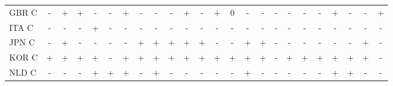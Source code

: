 \documentclass[12pt,bibliography=totoc]{article}
\begin{document}
\begin{appendices}
\begin{table}[H]
\begin{tabular}{l  cccccccc@{\hskip 0.2in}  cccccccc@{\hskip 0.2in}   ccccccc}
GBR C	&\cellcolor{red!25}-	&\cellcolor{green!25}+	&\cellcolor{green!25}+	&\cellcolor{red!25}-	&\cellcolor{red!25}-	&\cellcolor{green!25}+	&\cellcolor{red!25}-	&\cellcolor{red!25}-	&\cellcolor{red!25}-	&\cellcolor{green!25}+	&\cellcolor{red!25}-	&\cellcolor{green!25}+	&\cellcolor{yellow!25}0	&\cellcolor{red!25}-	&\cellcolor{red!25}-	&\cellcolor{red!25}-	&\cellcolor{red!25}-	&\cellcolor{red!25}-	&\cellcolor{red!25}-	&\cellcolor{green!25}+	&\cellcolor{red!25}-	&\cellcolor{red!25}-	&\cellcolor{green!25}+\\
ITA C	&\cellcolor{red!25}-	&\cellcolor{red!25}-	&\cellcolor{red!25}-	&\cellcolor{green!25}+	&\cellcolor{red!25}-	&\cellcolor{red!25}-	&\cellcolor{red!25}-	&\cellcolor{red!25}-	&\cellcolor{red!25}-	&\cellcolor{red!25}-	&\cellcolor{red!25}-	&\cellcolor{red!25}-	&\cellcolor{red!25}-	&\cellcolor{red!25}-	&\cellcolor{red!25}-	&\cellcolor{red!25}-	&\cellcolor{red!25}-	&\cellcolor{red!25}-	&\cellcolor{red!25}-	&\cellcolor{red!25}-	&\cellcolor{red!25}-	&\cellcolor{red!25}-	&\cellcolor{red!25}-\\
JPN C	&\cellcolor{red!25}-	&\cellcolor{green!25}+	&\cellcolor{red!25}-	&\cellcolor{red!25}-	&\cellcolor{red!25}-	&\cellcolor{red!25}-	&\cellcolor{green!25}+	&\cellcolor{green!25}+	&\cellcolor{green!25}+	&\cellcolor{green!25}+	&\cellcolor{green!25}+	&\cellcolor{red!25}-	&\cellcolor{red!25}-	&\cellcolor{green!25}+	&\cellcolor{green!25}+	&\cellcolor{red!25}-	&\cellcolor{red!25}-	&\cellcolor{red!25}-	&\cellcolor{red!25}-	&\cellcolor{red!25}-	&\cellcolor{red!25}-	&\cellcolor{green!25}+	&\cellcolor{red!25}-\\
KOR C	&\cellcolor{green!25}+	&\cellcolor{green!25}+	&\cellcolor{green!25}+	&\cellcolor{green!25}+	&\cellcolor{red!25}-	&\cellcolor{green!25}+	&\cellcolor{green!25}+	&\cellcolor{green!25}+	&\cellcolor{green!25}+	&\cellcolor{green!25}+	&\cellcolor{green!25}+	&\cellcolor{green!25}+	&\cellcolor{green!25}+	&\cellcolor{green!25}+	&\cellcolor{green!25}+	&\cellcolor{red!25}-	&\cellcolor{green!25}+	&\cellcolor{green!25}+	&\cellcolor{green!25}+	&\cellcolor{green!25}+	&\cellcolor{green!25}+	&\cellcolor{green!25}+	&\cellcolor{red!25}-\\
NLD C	&\cellcolor{red!25}-	&\cellcolor{red!25}-	&\cellcolor{red!25}-	&\cellcolor{green!25}+	&\cellcolor{green!25}+	&\cellcolor{green!25}+	&\cellcolor{red!25}-	&\cellcolor{green!25}+	&\cellcolor{red!25}-	&\cellcolor{red!25}-	&\cellcolor{red!25}-	&\cellcolor{red!25}-	&\cellcolor{red!25}-	&\cellcolor{green!25}+	&\cellcolor{red!25}-	&\cellcolor{red!25}-	&\cellcolor{red!25}-	&\cellcolor{red!25}-	&\cellcolor{red!25}-	&\cellcolor{green!25}+	&\cellcolor{green!25}+	&\cellcolor{red!25}-	&\cellcolor{red!25}-\\

\end{tabular}
\end{table}
\end{appendices}
\end{document}
